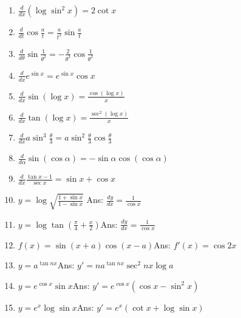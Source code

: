 \begin{enumerate}
\item
$\frac{d}{dx}(\log \sin^2 x) = 2 \cot x$

\item
$\frac{d}{dt} \cos \frac{a}{t} = \frac{a}{t^2} \sin \frac{a}{t}$

\item
$\frac{d}{d\theta} \sin \frac{1}{\theta^2} = -\frac{2}{\theta^3} \cos \frac{1}{\theta^2}$

\item
$\frac{d}{dx} e^{\sin x} = e^{\sin x} \cos x$

\item
$\frac{d}{dx} \sin(\log x) = \frac{\cos(\log x)}{x}$

\item
$\frac{d}{dx} \tan(\log x) = \frac{\sec^2(\log x)}{x}$

\item
$\frac{d}{dx} a \sin^3 \frac{\theta}{3} = a \sin^2 \frac{\theta}{3} \cos \frac{\theta}{3}$

\item
$\frac{d}{d\alpha} \sin(\cos \alpha) = -\sin \alpha \cos(\cos \alpha)$

\item
$\frac{d}{dx} \frac{\tan x - 1}{\sec x} = \sin x + \cos x$

\item
$y = \log \sqrt{ \frac{1 + \sin x}{1 - \sin x} }$\qquad\qquad\qquad\qquad\qquad\qquad 
Ans:  $\frac{dy}{dx} 	= \frac{1}{\cos x} $

\item
$y = \log \tan \left ( \frac{\pi}{4} + \frac{x}{2} \right )$\qquad\qquad\qquad\qquad\qquad\qquad Ans:  
$\frac{dy}{dx} 	= \frac{1}{\cos x}$

\item
$f(x) = \sin(x + a)\cos(x - a)$\qquad\qquad\qquad\qquad\qquad\qquad Ans:  $f'(x) 	= \cos 2x$

\item
$y = a^{\tan nx}$\qquad\qquad\qquad\qquad\qquad\qquad Ans:  $y' 	= na^{\tan nx}\sec^2 nx\log a$

\item
$y = e^{\cos x}\sin x$\qquad\qquad\qquad\qquad\qquad\qquad Ans:  $y' = e^{\cos x} (\cos x - \sin^2 x)$

\item
$y = e^x\log\sin x$\qquad\qquad\qquad\qquad\qquad\qquad Ans:  $y'= e^x(\cot x + \log\sin x)$


\end{enumerate}
